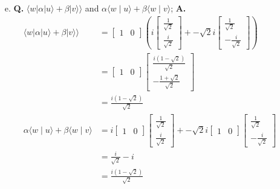 \documentclass[main.tex]{subfiles}
\begin{document}
\begin{enumerate}
\begin{enumerate}
        \item[e.] \textbf{Q.} $\langle w|\alpha| u\rangle+\beta|v\rangle\rangle$ and $\alpha\langle w \mid u\rangle+\beta\langle w \mid v\rangle$; \textbf{A.}
        \begin{align*}
            \langle w|\alpha| u\rangle+\beta|v\rangle\rangle            & = \left[\begin{array}{ll} 1 & 0 \end{array}\right] \left( i \left[\begin{array}{r} \frac{1}{\sqrt{2}} \\ \frac{i}{\sqrt{2}} \end{array}\right] 
                                                                            + -\sqrt{2}i \left[\begin{array}{l}\frac{1}{\sqrt{2}}\\-\frac{i}{\sqrt{2}}\end{array}\right] \right) \\            
                                                                        & = \left[\begin{array}{ll} 1 & 0 \end{array}\right] \left[\begin{array}{r} \frac{i(1-\sqrt{2})}{\sqrt{2}} \\ -\frac{1+\sqrt{2}}{\sqrt{2}} \end{array}\right] \\
                                                                        & = \frac{i(1-\sqrt{2})}{\sqrt{2}}\\
            \alpha\langle w \mid u\rangle+\beta\langle w \mid v\rangle  & = i \left[\begin{array}{ll} 1 & 0 \end{array}\right] \left[\begin{array}{r} \frac{1}{\sqrt{2}} \\ \frac{i}{\sqrt{2}} \end{array}\right] 
                                                                            + -\sqrt{2}i \left[\begin{array}{ll} 1 & 0 \end{array}\right] \left[\begin{array}{l}\frac{1}{\sqrt{2}}\\-\frac{i}{\sqrt{2}}\end{array}\right] \\
                                                                        & = \frac{i}{\sqrt{2}} - i\\
                                                                        & = \frac{i(1-\sqrt{2})}{\sqrt{2}}
        \end{align*}
        

\end{enumerate}
\end{enumerate}
\end{document}
